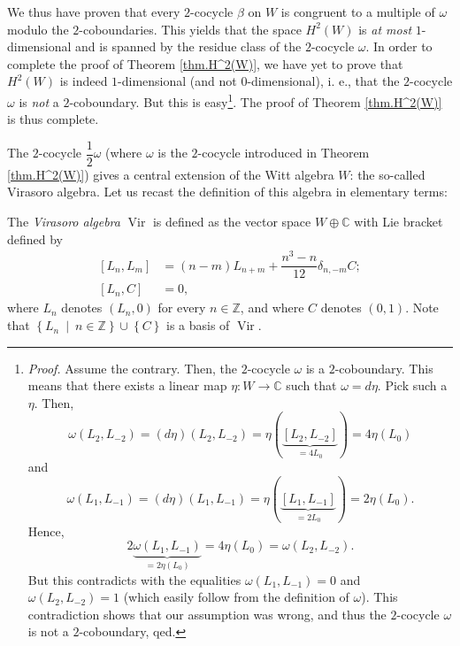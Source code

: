 \documentclass[etingof-lie.tex]{subfiles}
\begin{document}
We thus have proven that every $2$-cocycle $\beta$ on $W$ is congruent to a
multiple of $\omega$ modulo the $2$-coboundaries. This yields that the space
$H^{2}\left(  W\right)  $ is \textit{at most }$1$-dimensional and is spanned
by the residue class of the $2$-cocycle $\omega$. In order to complete the
proof of Theorem \ref{thm.H^2(W)}, we have yet to prove that $H^{2}\left(
W\right)  $ is indeed $1$-dimensional (and not $0$-dimensional), i. e., that
the $2$-cocycle $\omega$ is \textit{not} a $2$-coboundary. But this is
easy\footnote{\textit{Proof.} Assume the contrary. Then, the $2$-cocycle
$\omega$ is a $2$-coboundary. This means that there exists a linear map
$\eta:W\rightarrow\mathbb{C}$ such that $\omega=d\eta$. Pick such a $\eta$.
Then,%
\[
\omega\left(  L_{2},L_{-2}\right)  =\left(  d\eta\right)  \left(  L_{2}%
,L_{-2}\right)  =\eta\left(  \underbrace{\left[  L_{2},L_{-2}\right]
}_{=4L_{0}}\right)  =4\eta\left(  L_{0}\right)
\]
and%
\[
\omega\left(  L_{1},L_{-1}\right)  =\left(  d\eta\right)  \left(  L_{1}%
,L_{-1}\right)  =\eta\left(  \underbrace{\left[  L_{1},L_{-1}\right]
}_{=2L_{0}}\right)  =2\eta\left(  L_{0}\right)  .
\]
Hence,%
\[
2\underbrace{\omega\left(  L_{1},L_{-1}\right)  }_{=2\eta\left(  L_{0}\right)
}=4\eta\left(  L_{0}\right)  =\omega\left(  L_{2},L_{-2}\right)  .
\]
But this contradicts with the equalities $\omega\left(  L_{1},L_{-1}\right)
=0$ and $\omega\left(  L_{2},L_{-2}\right)  =1$ (which easily follow from the
definition of $\omega$). This contradiction shows that our assumption was
wrong, and thus the $2$-cocycle $\omega$ is not a $2$-coboundary, qed.}. The
proof of Theorem \ref{thm.H^2(W)} is thus complete.

The $2$-cocycle $\dfrac{1}{2}\omega$ (where $\omega$ is the $2$-cocycle
introduced in Theorem \ref{thm.H^2(W)}) gives a central extension of the Witt
algebra $W$: the so-called Virasoro algebra. Let us recast the definition of
this algebra in elementary terms:

\begin{definition}
The \textit{Virasoro algebra} $\operatorname*{Vir}$ is defined as the vector
space $W\oplus\mathbb{C}$ with Lie bracket defined by%
\begin{align*}
\left[  L_{n},L_{m}\right]   &  =\left(  n-m\right)  L_{n+m}+\dfrac{n^{3}%
-n}{12}\delta_{n,-m}C;\\
\left[  L_{n},C\right]   &  =0,
\end{align*}
where $L_{n}$ denotes $\left(  L_{n},0\right)  $ for every $n\in\mathbb{Z}$,
and where $C$ denotes $\left(  0,1\right)  $. Note that $\left\{  L_{n}%
\ \mid\ n\in\mathbb{Z}\right\}  \cup\left\{  C\right\}  $ is a basis of
$\operatorname*{Vir}$.
\end{definition}
\end{document}
